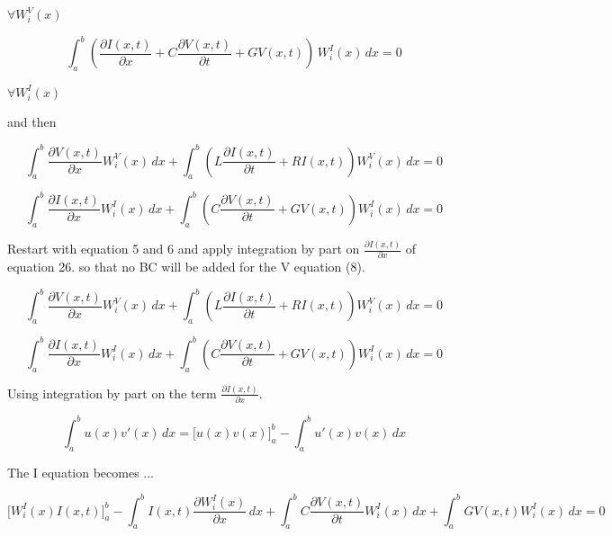 \documentclass[12pt, letterpaper]{article}
\begin{document}
$\forall W^V_i(x)$

\begin{equation}\int_a^b(\frac{\partial{I(x,t)}}{\partial{x}} + C \frac{\partial{V(x,t)}}{\partial{t}} + G V(x,t))\, W^I_i(x)\,dx = 0\end{equation}

$\forall W^I_i(x)$

and then


\begin{equation}
\int_a^b\frac{\partial{V(x,t)}}{\partial{x}} W^V_i(x)\,dx
+ \int_a^b(L \frac{\partial{I(x,t)}}{\partial{t}} +  R I(x,t)) W^V_i(x)\, dx
= 0
\end{equation}



\begin{equation}
\int_a^b\frac{\partial{I(x,t)}}{\partial{x}} W^I_i(x)\, dx
+ \int_a^b(C \frac{\partial{V(x,t)}}{\partial{t}} +  G V(x,t)) W^I_i(x) \, dx
= 0
\end{equation}


Restart with equation 5 and 6 and apply integration by part on $\frac{\partial{I(x,t)}}{\partial{x}}$ of equation 26. so that no BC will be added for the V equation (8).


\begin{equation}
	\int_a^b\frac{\partial{V(x,t)}}{\partial{x}} W^V_i(x)\,dx
	+ \int_a^b(L \frac{\partial{I(x,t)}}{\partial{t}} +  R I(x,t)) W^V_i(x)\, dx
	= 0
\end{equation}



\begin{equation}
	\int_a^b\frac{\partial{I(x,t)}}{\partial{x}} W^I_i(x)\, dx
	+ \int_a^b(C \frac{\partial{V(x,t)}}{\partial{t}} +  G V(x,t)) W^I_i(x) \, dx
	= 0
\end{equation}

Using integration by part on the term $\frac{\partial{I(x,t)}}{\partial{x}}$.

\begin{equation}\int_a^b u(x) v'(x) \, dx = \Big[u(x) v(x)\Big]_a^b - \int_a^b u'(x) v(x) \, dx\end{equation}

The I equation becomes ...

\begin{equation}
	\Big[W^I_i(x) I(x,t) \Big]_a^b
	-\int_a^b I(x,t) \frac{\partial{W^I_i(x)}}{\partial{x}}\, dx
	+ \int_a^b C \frac{\partial{V(x,t)}}{\partial{t}} W^I_i(x)\, dx
	+  \int_a^b G V(x,t) W^I_i(x)\, dx
	= 0
\end{equation}
\end{document}
